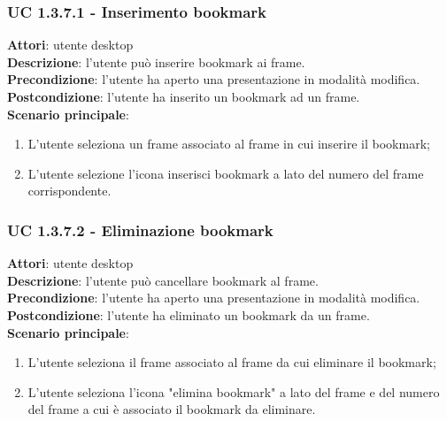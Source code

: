 \subsubsection{UC 1.3.7.1 - Inserimento bookmark}{
	\label{uc1.3.7.1}
	\textbf{Attori}: utente desktop \\
	\textbf{Descrizione}: l'utente può inserire bookmark ai frame. \\
	\textbf{Precondizione}: l'utente ha aperto una presentazione in modalità modifica.	\\
	\textbf{Postcondizione}: l'utente ha inserito un bookmark ad un frame.	\\
	\textbf{Scenario principale}:
	\begin{enumerate}
		\item L'utente seleziona un frame associato al frame in cui inserire il bookmark;
		\item L'utente selezione l'icona inserisci bookmark a lato del numero del frame corrispondente.
	\end{enumerate}
}
\subsubsection{UC 1.3.7.2 - Eliminazione bookmark}{
	\label{uc1.3.7.2}
	\textbf{Attori}: utente desktop \\
	\textbf{Descrizione}: l'utente può cancellare bookmark al frame. \\
	\textbf{Precondizione}: l'utente ha aperto una presentazione in modalità modifica.	\\
	\textbf{Postcondizione}: l'utente ha eliminato un bookmark da un frame.	\\
	\textbf{Scenario principale}:
	\begin{enumerate}
		\item L'utente seleziona il frame associato al frame da cui eliminare il bookmark;
		\item L'utente seleziona l'icona "elimina bookmark" a lato del frame e del numero del frame a cui è associato il bookmark da eliminare.
	\end{enumerate}
}
